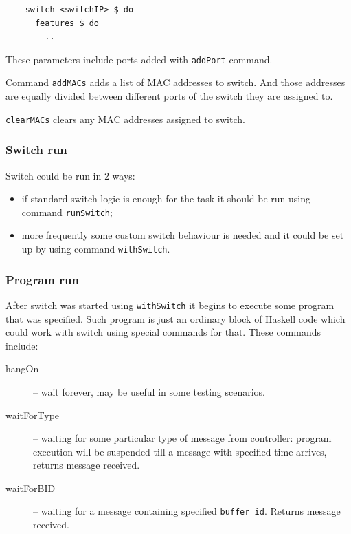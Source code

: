 \documentclass[9pt,a4paper]{article}
\begin{document}
\begin{lstlisting}
    switch <switchIP> $ do
      features $ do
        ..
\end{lstlisting}

These parameters include ports added with \lstinline!addPort! command.

Command \lstinline!addMACs! adds a list of MAC addresses to
switch. And those addresses are equally divided between different
ports of the switch they are assigned to.

\lstinline!clearMACs! clears any MAC addresses assigned to switch.


\subsubsection{Switch run}

Switch could be run in 2 ways:

\begin{itemize}
  \item if standard switch logic is enough for the task it should be
    run using command \lstinline!runSwitch!;
  \item more frequently some custom switch behaviour is needed and it
    could be set up by using command \lstinline!withSwitch!.
\end{itemize}


\subsubsection{Program run}

After switch was started using \lstinline!withSwitch! it begins to
execute some program that was specified. Such program is just an
ordinary block of Haskell code which could work with switch using
special commands for that. These commands include:

\begin{description}
  \item[hangOn] -- wait forever, may be useful in some testing scenarios.

  \item[waitForType] -- waiting for some particular type of message
    from controller: program execution will be suspended till a
    message with specified time arrives, returns message received.

  \item[waitForBID] -- waiting for a message containing specified
    \lstinline!buffer id!.  Returns message received.

\end{description}
\end{document}
